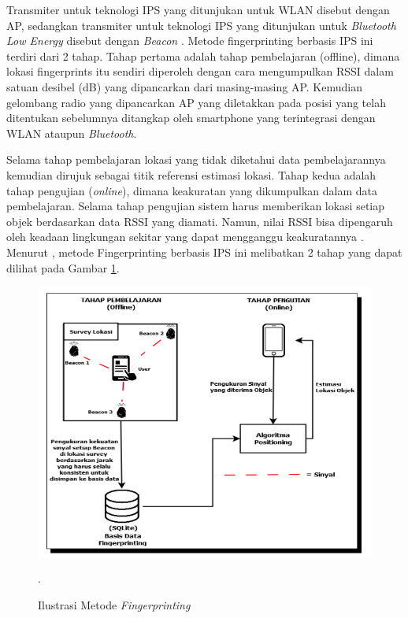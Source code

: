 \par Transmiter untuk teknologi IPS yang ditunjukan untuk WLAN disebut dengan AP, sedangkan transmiter untuk teknologi IPS yang ditunjukan untuk \textit{Bluetooth Low Energy} disebut dengan \textit{Beacon } \cite{puspitasari2020}. Metode fingerprinting berbasis IPS ini terdiri dari 2 tahap. Tahap pertama adalah tahap pembelajaran (offline), dimana lokasi fingerprints itu sendiri diperoleh dengan cara mengumpulkan RSSI dalam satuan desibel (dB) yang dipancarkan dari masing-masing AP. Kemudian gelombang radio yang dipancarkan AP yang diletakkan pada posisi yang telah ditentukan sebelumnya ditangkap oleh smartphone yang terintegrasi dengan WLAN ataupun \textit{Bluetooth}.

\par Selama tahap pembelajaran lokasi yang tidak diketahui data pembelajarannya kemudian dirujuk sebagai titik referensi estimasi lokasi. Tahap kedua adalah tahap pengujian (\textit{online}), dimana keakuratan yang dikumpulkan dalam data pembelajaran. Selama tahap pengujian sistem harus memberikan lokasi setiap objek berdasarkan data RSSI yang diamati. Namun, nilai RSSI bisa dipengaruh oleh keadaan lingkungan sekitar yang dapat mengganggu keakuratannya \citep{subhan2011indoor}. Menurut \citep{yudha2018indoor}, metode Fingerprinting berbasis IPS ini melibatkan 2 tahap yang dapat dilihat pada Gambar \ref{img:fingerprinting}.

\begin{figure}[H]
\centering
{\includegraphics [scale=.5]{gambar/bab2/Fingerprinting}}
\caption{Ilustrasi Metode \textit{Fingerprinting} \citep{yudha2018indoor}}.
\label{img:fingerprinting}
\end{figure}

